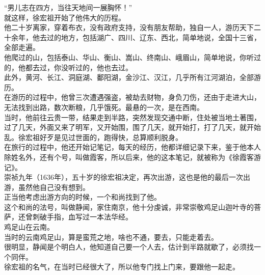 \begin{multicols}{\theparacolNo}
“男儿志在四方，当往天地间一展胸怀！”\\

就这样，徐宏祖开始了他伟大的历程。\\

他二十岁离家，穿着布衣，没有政府支持，没有朋友帮助，独自一人，游历天下二十余年，他去过的地方，包括湖广、四川、辽东、西北，简单地说，全国十三省，全部走遍。\\

他爬过的山，包括泰山、华山、衡山、嵩山、终南山、峨眉山，简单地说，你听过的，他都去过，你没听过的，他也去过。\\

此外，黄河、长江、洞庭湖、鄱阳湖，金沙江、汉江，几乎所有江河湖泊，全部游历。\\

在游历的过程中，他曾三次遭遇强盗，被劫去财物，身负刀伤，还由于走进大山，无法找到出路，数次断粮，几乎饿死。最悬的一次，是在西南。\\

当时，他前往云贵一带，结果走到半路，突然发现交通中断，住处被当地土著围，过了几天，外面又来了明军，又开始围，围了几天，就开始打，打了几天，就开始乱。徐宏祖好歹是见过世面的，跑得快，总算顺利脱身。\\

在旅行的过程中，他还开始记笔记，每天的经历，他都详细记录下来，鉴于他本人除姓名外，还有个号，叫做霞客，所以后来，他的这本笔记，就被称为《徐霞客游记》。\\

崇祯九年（1636年），五十岁的徐宏祖决定，再次出游，这也是他的最后一次出游，虽然他自己没有想到。\\

正当他考虑出游方向的时候，一个和尚找到了他。\\

这个和尚的法号，叫做静闻，家住南京，他十分虔诚，非常崇敬鸡足山迦叶寺的菩萨，还曾刺破手指，血写过一本法华经。\\

鸡足山在云南。\\

当时的云南鸡足山，算是蛮荒之地，啥也不通，要去，只能走着去。\\

很明显，静闻是个明白人，他知道自己要一个人去，估计到半路就歇了，必须找一个同伴。\\

徐宏祖的名气，在当时已经很大了，所以他专门找上门来，要跟他一起走。\\


\end{multicols}
